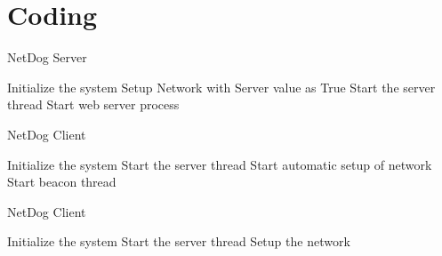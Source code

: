 \chapter{Coding}

\begin{algorithm}
\begin{algorithmic}[1]
\caption{NetDog Server}
\State Initialize the system 
\State Setup Network with Server value as True
\State Start the server thread 
\State Start web server process
\end{algorithmic}
\end{algorithm}

\begin{algorithm}
\begin{algorithmic}[1]
\caption{NetDog Client}
\State Initialize the system 
\State Start the server thread
\State Start automatic setup of network 
\State Start beacon thread
\end{algorithmic}
\end{algorithm}

\begin{algorithm}
\begin{algorithmic}[1]
\caption{NetDog Client}
\State Initialize the system 
\State Start the server thread
\State Setup the network
\end{algorithmic}
\end{algorithm}

